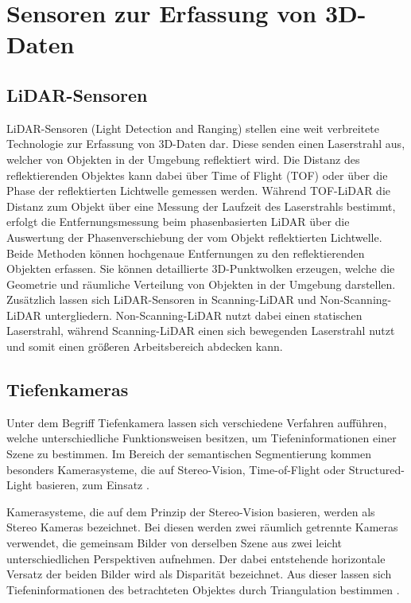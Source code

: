 \chapter{Sensoren zur Erfassung von 3D-Daten}

\section{LiDAR-Sensoren}
LiDAR-Sensoren (Light Detection and Ranging) stellen eine weit verbreitete
Technologie zur Erfassung von 3D-Daten dar. Diese senden einen Laserstrahl aus,
welcher von Objekten in der Umgebung reflektiert wird. Die Distanz des
reflektierenden Objektes kann dabei über Time of Flight (TOF) oder über die
Phase der reflektierten Lichtwelle gemessen werden. Während TOF-LiDAR die
Distanz zum Objekt über eine Messung der Laufzeit des Laserstrahls bestimmt,
erfolgt die Entfernungsmessung beim phasenbasierten LiDAR über die Auswertung
der Phasenverschiebung der vom Objekt reflektierten Lichtwelle. Beide Methoden
können hochgenaue Entfernungen zu den reflektierenden Objekten erfassen. Sie
können detaillierte 3D-Punktwolken erzeugen, welche die Geometrie und räumliche
Verteilung von Objekten in der Umgebung darstellen. Zusätzlich lassen sich
LiDAR-Sensoren in Scanning-LiDAR und Non-Scanning-LiDAR untergliedern.
Non-Scanning-LiDAR nutzt dabei einen statischen Laserstrahl, während
Scanning-LiDAR einen sich bewegenden Laserstrahl nutzt und somit einen größeren
Arbeitsbereich abdecken kann. \cite{8529992}

\section{Tiefenkameras}
Unter dem Begriff Tiefenkamera lassen sich verschiedene Verfahren aufführen,
welche unterschiedliche Funktionsweisen besitzen, um Tiefeninformationen einer
Szene zu bestimmen. Im Bereich der semantischen Segmentierung kommen besonders
Kamerasysteme, die auf Stereo-Vision, Time-of-Flight oder Structured-Light
basieren, zum Einsatz \cite{20222324}.

Kamerasysteme, die auf dem Prinzip der Stereo-Vision basieren, werden als
Stereo Kameras bezeichnet. Bei diesen werden zwei räumlich getrennte Kameras
verwendet, die gemeinsam Bilder von derselben Szene aus zwei leicht
unterschiedlichen Perspektiven aufnehmen. Der dabei entstehende horizontale
Versatz der beiden Bilder wird als Disparität bezeichnet. Aus dieser lassen
sich Tiefeninformationen des betrachteten Objektes durch Triangulation
bestimmen \cite{8932817}.

